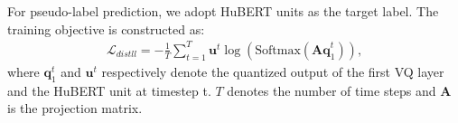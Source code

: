 
For pseudo-label prediction, we adopt HuBERT units as the target label. The training objective is constructed as:
\begin{align*}
\mathcal{L}_{distll}=-\frac{1}{T}\sum_{t=1}^T \mathbf{u}^t\log(\text{Softmax}(\mathbf{Aq}_1^t)),
\end{align*}
where $\mathbf{q}_1^t$ and $\mathbf{u}^t$ respectively denote the quantized output of the first VQ layer and the HuBERT unit at timestep t. $T$ denotes the number of time steps and $\mathbf{A}$ is the projection matrix.    




